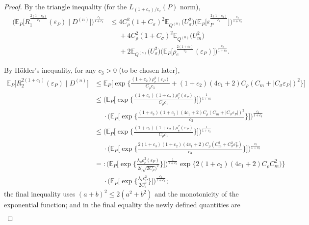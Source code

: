 \documentclass[aos]{imsart}
\newcommand{\E}{\mathbb{E}}
\begin{document}
\begin{proof}
		By the triangle inequality (for the $L_{(1+c_2)/c_2}(P)$ norm), 
		\begin{align*}
			\bigg(\E_P\bigg[R_1^{\frac{2(1+c_2)}{c_2}}(\varepsilon_P)  \; \bigg| \; D^{(n)} \bigg]\bigg)^{\frac{c_2}{1+c_2}} &\leq 4C_\rho^2(1+C_\sigma)^2 \E_{Q^{(n)}} \big( U_\sigma^2\big)\bigg(\E_P\bigg[\varepsilon_P^{\frac{2(1+c_2)}{c_2}}\bigg]\bigg)^{\frac{c_2}{1+c_2}} \\
			&\phantom{\leq} + 4C_\rho^2(1+C_\sigma)^2 \E_{Q^{(n)}} \big(U_m^2\big) \\
			&\phantom{\leq} +  2\E_{Q^{(n)}}\big(U_\sigma^2\big)\bigg(\E_P\bigg[\rho_{e}^{\frac{2(1+c_2)}{c_2}}(\varepsilon_P)\bigg]\bigg)^{\frac{c_2}{1+c_2}}.
		\end{align*}
		
		By H\"older's inequality, for any $c_3>0$ (to be chosen later),
		\begin{align*}
			\E_P\big[R_2^{2(1+c_2)}(\varepsilon_P)  \; \big| \; D^{(n)} \big] & \leq \E_P\bigg[\exp\bigg\{ \frac{(1+c_2)\rho_{e}^2(\varepsilon_P)}{C_\rho c_1} + (1+c_2)(4c_1+2)C_\rho(C_m+|C_\sigma\varepsilon_P|)^2\bigg\}\bigg]\\
			&\leq \bigg(\E_P\bigg[\exp\bigg\{ \frac{(1+c_3)(1+c_2)\rho_{e}^2(\varepsilon_P)}{C_\rho c_1} \bigg\}\bigg]\bigg)^{\frac1{1+c_3}} \\
			&\phantom{=} \cdot \bigg(\E_P\bigg[ \exp\bigg\{\frac{(1+c_3)(1+c_2)(4c_1+2)C_\rho(C_m+|C_\sigma\varepsilon_P|)^2}{c_3}\bigg\}\bigg]\bigg)^{\frac{c_3}{1+c_3}}\\
			&\leq \bigg(\E_P\bigg[\exp\bigg\{ \frac{(1+c_3)(1+c_2)\rho_{e}^2(\varepsilon_P)}{C_\rho c_1} \bigg\}\bigg]\bigg)^{\frac1{1+c_3}} \\
			&\phantom{=} \cdot \bigg(\E_P\bigg[ \exp\bigg\{\frac{2(1+c_3)(1+c_2)(4c_1+2)C_\rho(C_m^2+C_\sigma^2\varepsilon_P^2)}{c_3}\bigg\}\bigg]\bigg)^{\frac{c_3}{1+c_3}}\\
			&=: \Bigg(\E_P\Bigg[\exp\Bigg\{ \frac{\lambda_\rho \rho_{e}^2(\varepsilon_P)}{2\big(\sqrt{2C_\rho}\big)^2} \Bigg\} \Bigg]\Bigg)^{\frac1{1+c_3}}  \exp\big\{2(1+c_2)(4c_1+2)C_\rho C_m^2)\big\}\\
			&\phantom{=} \cdot  \bigg(\E_P\bigg[ \exp\bigg\{\frac{\lambda_\varepsilon \varepsilon_P^2}{2C_\varepsilon^2}\bigg\}\bigg]\bigg)^{\frac{c_3}{1+c_3}};
		\end{align*}
		the final inequality uses $(a+b)^2 \leq 2(a^2+b^2)$ and the monotonicity of the exponential function; and in the final equality the newly defined quantities are
		\begin{align*}

\end{align*}
\end{proof}
\end{document}
